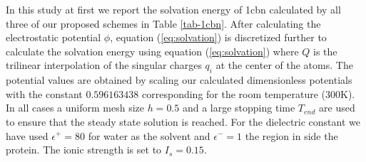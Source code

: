   In this study at first we report the solvation energy of 1cbn calculated by all three of our proposed schemes in Table \ref{tab-1cbn}. After calculating the electrostatic potential $\phi$, equation (\ref{eq:solvation}) is discretized further to calculate the solvation energy using equation (\ref{eq:solvation}) where $Q$ is the trilinear interpolation of the singular charges $q_i$ at the center of the atoms.  The potential values are obtained by scaling our calculated dimensionless potentials with the constant $0.596163438$ corresponding for the room temperature (300K). In all cases a uniform mesh size $h = 0.5$ and a large stopping time $T_{end}$ are used to ensure that the steady state solution is reached. For the dielectric constant we have used $\epsilon^+=80$ for water as the solvent and $\epsilon^-=1$ the region in side the protein. The ionic strength is set to $I_s = 0.15$.

